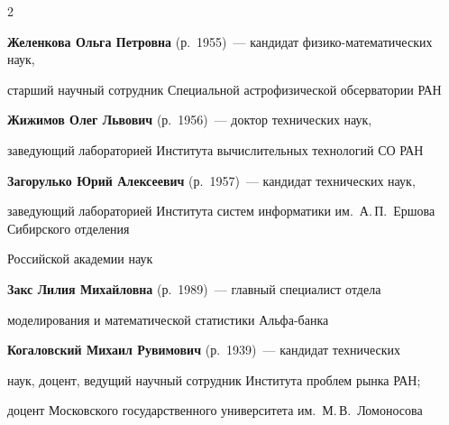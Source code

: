 \begin{multicols}{2}
\vspace*{4pt}



\noindent

\textbf{Желенкова Ольга Петровна} (р.\ 1955)~---  кандидат фи\-зи\-ко-ма\-те\-ма\-ти\-че\-ских наук, 

старший научный сотрудник Специальной астрофизической обсерватории РАН



\vspace*{4pt}



\noindent

\textbf{Жижимов Олег Львович} (р.\ 1956)~--- доктор технических наук, 

заведующий лабораторией Института вычислительных технологий СО РАН



\vspace*{4pt}



\noindent

\textbf{Загорулько Юрий Алексеевич} (р.\ 1957)~--- кандидат технических наук, 

заведующий лабораторией Института систем информатики им.\ А.\,П.~Ершова Сибирского отделения 

Российской академии наук



\vspace*{4pt}



\noindent

\textbf{Закс Лилия Михайловна} (р.\ 1989)~--- главный специалист отдела 

моделирования и математической статистики Аль\-фа-банка



\vspace*{4pt}



\noindent

\textbf{Когаловский Михаил Рувимович} (р.\ 1939)~--- кандидат технических

наук, доцент, ведущий научный сотрудник Института проблем рынка РАН;

доцент Московского государственного университета им.\ М.\,В.~Ломоносова



\vspace*{4pt}




\end{multicols}
